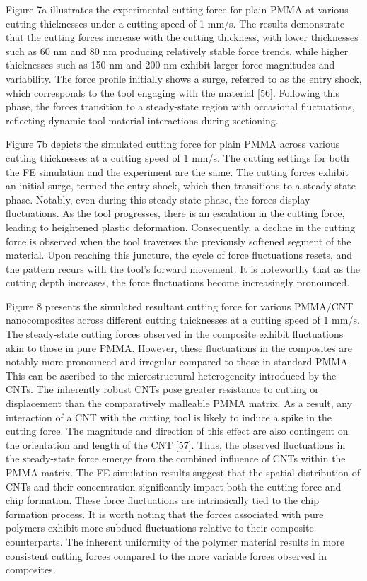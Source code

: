 \documentclass{article}
\begin{document}
Figure 7a illustrates the experimental cutting force for plain PMMA at various cutting thicknesses under a cutting speed of 1 mm/s. The results demonstrate that the cutting forces increase with the cutting thickness, with lower thicknesses such as 60 nm and 80 nm producing relatively stable force trends, while higher thicknesses such as 150 nm and 200 nm exhibit larger force magnitudes and variability. The force profile initially shows a surge, referred to as the entry shock, which corresponds to the tool engaging with the material [56]. Following this phase, the forces transition to a steady-state region with occasional fluctuations, reflecting dynamic tool-material interactions during sectioning.

Figure 7b depicts the simulated cutting force for plain PMMA across various cutting thicknesses at a cutting speed of 1 mm/s. The cutting settings for both the FE simulation and the experiment are the same. The cutting forces exhibit an initial surge, termed the entry shock, which then transitions to a steady-state phase. Notably, even during this steady-state phase, the forces display fluctuations. As the tool progresses, there is an escalation in the cutting force, leading to heightened plastic deformation. Consequently, a decline in the cutting force is observed when the tool traverses the previously softened segment of the material. Upon reaching this juncture, the cycle of force fluctuations resets, and the pattern recurs with the tool’s forward movement. It is noteworthy that as the cutting depth increases, the force fluctuations become increasingly pronounced.

Figure 8 presents the simulated resultant cutting force for various PMMA/CNT nanocomposites across different cutting thicknesses at a cutting speed of 1 mm/s. The steady-state cutting forces observed in the composite exhibit fluctuations akin to those in pure PMMA. However, these fluctuations in the composites are notably more pronounced and irregular compared to those in standard PMMA. This can be ascribed to the microstructural heterogeneity introduced by the CNTs. The inherently robust CNTs pose greater resistance to cutting or displacement than the comparatively malleable PMMA matrix. As a result, any interaction of a CNT with the cutting tool is likely to induce a spike in the cutting force. The magnitude and direction of this effect are also contingent on the orientation and length of the CNT [57]. Thus, the observed fluctuations in the steady-state force emerge from the combined influence of CNTs within the PMMA matrix. The FE simulation results suggest that the spatial distribution of CNTs and their concentration significantly impact both the cutting force and chip formation. These force fluctuations are intrinsically tied to the chip formation process. It is worth noting that the forces associated with pure polymers exhibit more subdued fluctuations relative to their composite counterparts. The inherent uniformity of the polymer material results in more consistent cutting forces compared to the more variable forces observed in composites.
\end{document}
